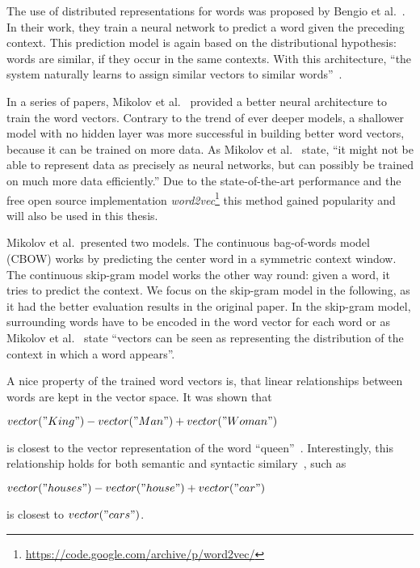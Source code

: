 \documentclass{sig-alternate-05-2015}
\begin{document}
The use of distributed representations for words was proposed by Bengio et al.~\cite{Bengio2003}.
In their work, they train a neural network to predict a word given the preceding context.
This prediction model is again based on the distributional hypothesis: words are similar, if they occur in the same contexts.
With this architecture, ``the system naturally learns to assign similar vectors to similar words''~\cite{Baroni2014}.

In a series of papers, Mikolov et al.~\cite{Mikolov2013,Mikolov2013a,Mikolov2013b} provided a better neural architecture to train the word vectors.
Contrary to the trend of ever deeper models, a shallower model with no hidden layer was more successful in building better word vectors, because it can be trained on more data.
As Mikolov et al.~\cite{Mikolov2013a} state, ``it might not be able to represent data as precisely as neural networks, but can possibly be trained on much more data efficiently.''
Due to the state-of-the-art performance and the free open source implementation \emph{word2vec}\footnote{\url{https://code.google.com/archive/p/word2vec/}} this method gained popularity and will also be used in this thesis.

Mikolov et al.\ presented two models.
The continuous bag-of-words model (CBOW) works by predicting the center word in a symmetric context window.
The continuous skip-gram model works the other way round: given a word, it tries to predict the context.
We focus on the skip-gram model in the following, as it had the better evaluation results in the original paper.
In the skip-gram model, surrounding words have to be encoded in the word vector for each word or as Mikolov et al.~\cite{Mikolov2013} state ``vectors can be seen as representing the distribution of the context in which a word appears''.

A nice property of the trained word vectors is, that linear relationships between words are kept in the vector space.
It was shown that
\begin{center}
       $vector("King") - vector("Man") + vector("Woman")$
\end{center}
is closest to the vector representation of the word ``queen''~\cite{Mikolov2013b}.
Interestingly, this relationship holds for both semantic and syntactic similary~\cite{Mikolov2013a}, such as
\begin{center}
       $vector("houses") - vector("house") + vector("car")$
\end{center}
is closest to $vector("cars")$.
\end{document}

